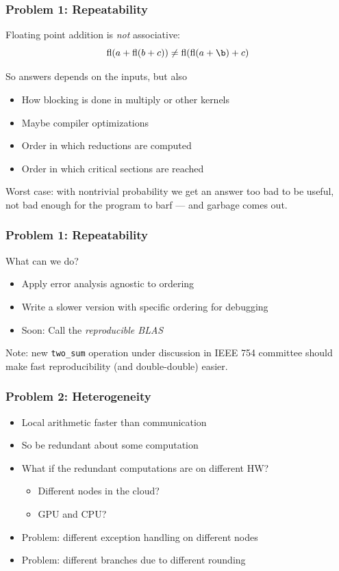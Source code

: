 \documentclass{beamer}
\begin{document}
\begin{frame}
  \frametitle{Problem 1: Repeatability}

  Floating point addition is {\em not} associative:
  \[
    \fl(a + \fl(b + c)) \neq \fl(\fl(a + \b) + c)
  \]

  So answers depends on the inputs, but also
  \begin{itemize}
  \item How blocking is done in multiply or other kernels
  \item Maybe compiler optimizations
  \item Order in which reductions are computed
  \item Order in which critical sections are reached
  \end{itemize}

  \vspace{4mm}
  Worst case: with nontrivial probability we get an answer
  too bad to be useful, not bad enough for the program to barf ---
  and garbage comes out.

\end{frame}


\begin{frame}
  \frametitle{Problem 1: Repeatability}

  What can we do?
  \begin{itemize}
  \item Apply error analysis agnostic to ordering
  \item Write a slower version with specific ordering for debugging
  \item Soon: Call the {\em reproducible BLAS}
  \end{itemize}
  Note: new {\tt two\_sum} operation under discussion in IEEE 754
  committee should make fast reproducibility (and double-double) easier.
\end{frame}


\begin{frame}
  \frametitle{Problem 2: Heterogeneity}

  \begin{itemize}
  \item Local arithmetic faster than communication
  \item So be redundant about some computation
  \item What if the redundant computations are on different HW?
    \begin{itemize}
    \item Different nodes in the cloud?
    \item GPU and CPU?
    \end{itemize}
  \item Problem: different exception handling on different nodes
  \item Problem: different branches due to different rounding
  \end{itemize}
\end{frame}
\end{document}
